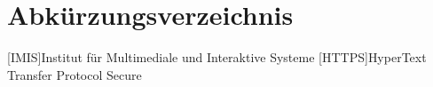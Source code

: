 
\cleardoublepage
{}
{}
\chapter*{Abkürzungsverzeichnis}
\label{section-abbrevs}



\begin{acronym}[CoLab]
  [IMIS]{Institut für Multimediale und Interaktive Systeme}
  [HTTPS]{HyperText Transfer Protocol Secure}
\end{acronym}
